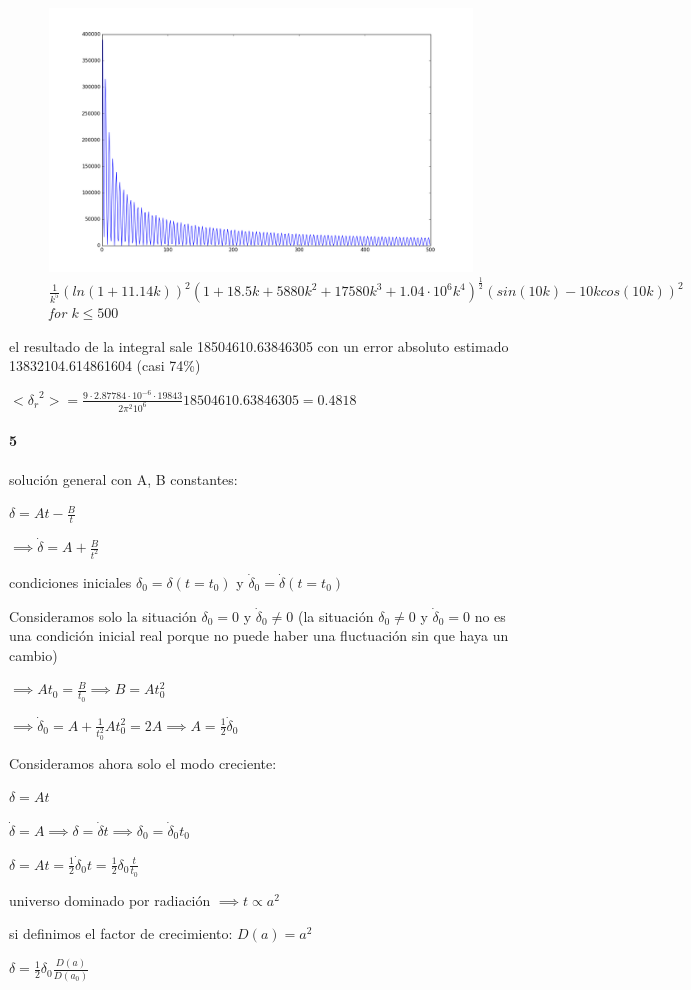 \documentclass[12pt]{book}
\begin{document}
\begin{figure}[H]
 \centering
 \includegraphics[scale=0.5]{graf2.png}
 \caption{\emph{$ \frac{1}{k^5}(ln(1+11.14k))^2 
(1+18.5k + 5880k^2+17580k^3 + 1.04 \cdot 10^6 k^4)^{\frac{1}{2}}(sin(10k) - 10 k  cos(10k))^2$ for $k\le 500$}}
\end{figure}

el resultado de la integral sale 18504610.63846305 con un error absoluto estimado  13832104.614861604 (casi 74\%)

$<{\delta_r}^2> = \frac{9 \cdot  2.87784 \cdot 10^{-6} \cdot 19843 }{2\pi^2 10^6} 18504610.63846305 = 0.4818$


\paragraph{5}

solución general con A, B constantes:

$\delta = A t - \frac{B}{t}$

$\implies \dot \delta = A + \frac{B}{t^2}$

condiciones iniciales $\delta_0=\delta(t=t_0) $ y $\dot\delta_0 = \dot\delta(t=t_0)$

Consideramos solo la situación $\delta_0 = 0$ y $\dot\delta_0 \neq 0$ (la situación $\delta_0 \neq 0$ y $\dot\delta_0 = 0$ 
no es una condición inicial real porque no puede haber una fluctuación sin que haya un cambio)

$\implies A t_0 = \frac{B}{t_0} \implies B = A t_0^2$

$\implies \dot\delta_0 = A + \frac{1}{t_0^2} A t_0^2 = 2 A \implies A = \frac{1}{2} \dot\delta_0$

Consideramos ahora solo el modo creciente:

$\delta = A t$

$\dot \delta = A \implies \delta = \dot\delta t \implies \delta_0 = \dot\delta_0 t_0$

$\delta = A t= \frac{1}{2} \dot\delta_0 t= \frac{1}{2}\delta_0 \frac{t}{t_0}$

universo dominado por radiación $\implies t \propto a^2$

si definimos el factor de crecimiento: $D(a) = a^2$
 
$\delta = \frac{1}{2} \delta_{0} \frac{D(a)}{D(a_{0})} $ 
\end{document}
